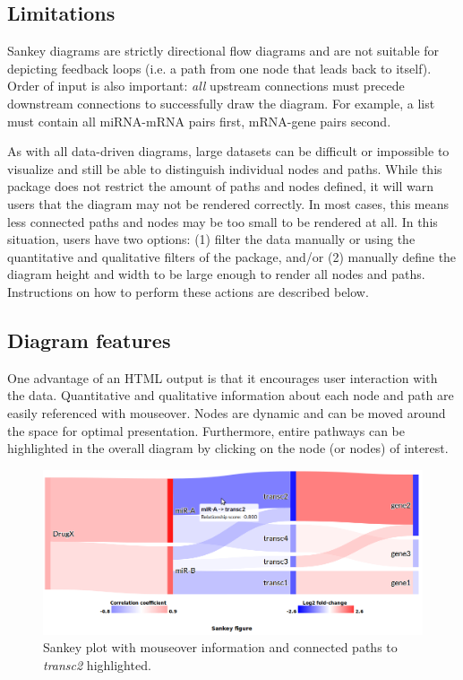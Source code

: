 \documentclass[a4paper]{article}
\begin{document}
    \subsection{Limitations}
Sankey diagrams are strictly directional flow diagrams and are not suitable for depicting feedback loops (i.e. a path from one node that leads back to itself). Order of input is also important: \textit{all} upstream connections must precede downstream connections to successfully draw the diagram. For example, a list must contain all miRNA-mRNA pairs first, mRNA-gene pairs second.

As with all data-driven diagrams, large datasets can be difficult or impossible to visualize and still be able to distinguish individual nodes and paths. While this package does not restrict the amount of paths and nodes defined, it will warn users that the diagram may not be rendered correctly. In most cases, this means less connected paths and nodes may be too small to be rendered at all. In this situation, users have two options: (1) filter the data manually or using the quantitative and qualitative filters of the package, and/or (2) manually define the diagram height and width to be large enough to render all nodes and paths. Instructions on how to perform these actions are described below. 

    \subsection{Diagram features}
One advantage of an HTML output is that it encourages user interaction with the data. Quantitative and qualitative information about each node and path are easily referenced with mouseover. Nodes are dynamic and can be moved around the space for optimal presentation. Furthermore, entire pathways can be highlighted in the overall diagram by clicking on the node (or nodes) of interest.

\begin{figure}[htbp]
    \begin{center}
    \includegraphics[width=\textwidth]{figure4.png}
        \caption{Sankey plot with mouseover information and connected paths to \textit{transc2} highlighted.}
    \end{center}
\end{figure}
\end{document}
